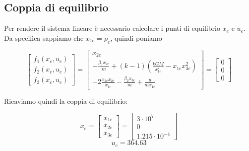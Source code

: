 \documentclass{article}
\begin{document}
\subsection{Coppia di equilibrio}
Per rendere il sistema lineare è necessario calcolare i punti di equilibrio $x_e$ e $u_e$.\\
Da specifica sappiamo che $x_{1e}=\rho_e$, quindi poniamo
\begin{large}
\[
\begin{bmatrix} f_1(x_e,u_e) \\ f_2(x_e,u_e) \\ f_3(x_e,u_e)\end{bmatrix} =
\begin{bmatrix} x_{2e} \\
-\frac{\beta_1 x_{2e}}{m} + (k-1)(\frac{kG M}{x_{1e}^2} - x_{1e} x_{3e}^2) \\ 
-2\frac{x_{3e} x_{2e}}{x_{1e}} - \frac{\beta_2 x_{3e}}{m} + \frac{u}{m x_{1e}}  \end{bmatrix} =
\begin{bmatrix} 0 \\ 0 \\ 0\end{bmatrix}
\]
\end{large}
Ricaviamo quindi la coppia di equilibrio:
\begin{large}
\[
x_e=\begin{bmatrix} x_{1e} \\ x_{2e} \\ x_{3e}\end{bmatrix}=
\begin{bmatrix} 3\cdot10^7 \\ 0 \\ 1.215\cdot10^{-4}\end{bmatrix}
\]
\[
u_e=364.63
\]
\end{large}
\end{document}
